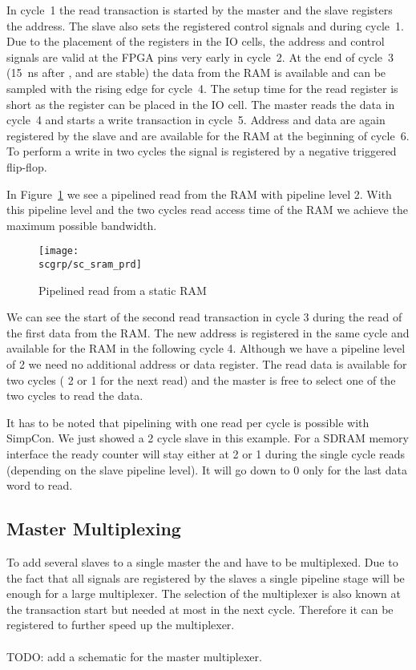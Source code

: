 In cycle~1 the read transaction is started by the master and the
slave registers the address. The slave also sets the registered
control signals  and  during cycle~1. Due to the
placement of the registers in the IO cells, the address and control
signals are valid at the FPGA pins very early in cycle~2. At the end
of cycle~3 (15~ns after ,  and 
are stable) the data from the RAM is available and can be sampled
with the rising edge for cycle~4. The setup time for the read
register is short as the register can be placed in the IO cell. The
master reads the data in cycle~4 and starts a write transaction in
cycle~5. Address and data are again registered by the slave and are
available for the RAM at the beginning of cycle~6. To perform a
write in two cycles the  signal is registered by a
negative triggered flip-flop.

In Figure~\ref{fig:sc:sram:prd} we see a pipelined read from the RAM
with pipeline level 2. With this pipeline level and the two cycles
read access time of the RAM we achieve the maximum possible
bandwidth.

\begin{figure}
    \centering
    \texttt{[image: \\scgrp/sc\_sram\_prd]}
    \caption{Pipelined read from a static RAM}
    \label{fig:sc:sram:prd}
\end{figure}

We can see the start of the second read transaction in cycle 3
during the read of the first data from the RAM. The new address is
registered in the same cycle and available for the RAM in the
following cycle 4. Although we have a pipeline level of 2 we need no
additional address or data register. The read data is available for
two cycles ( 2 or 1 for the next read) and the master
is free to select one of the two cycles to read the data.

It has to be noted that pipelining with one read per cycle is
possible with SimpCon. We just showed a 2 cycle slave in this
example. For a SDRAM memory interface the ready counter will stay
either at 2 or 1 during the single cycle reads (depending on the
slave pipeline level). It will go down to 0 only for the last data
word to read.

\subsection{Master Multiplexing}

To add several slaves to a single master the  and
 have to be multiplexed. Due to the fact that all
 signals are registered by the slaves a single
pipeline stage will be enough for a large multiplexer. The selection
of the multiplexer is also known at the transaction start but needed
at most in the next cycle. Therefore it can be registered to further
speed up the multiplexer.
\ \\
\ \\
TODO: add a schematic for the master  multiplexer.

